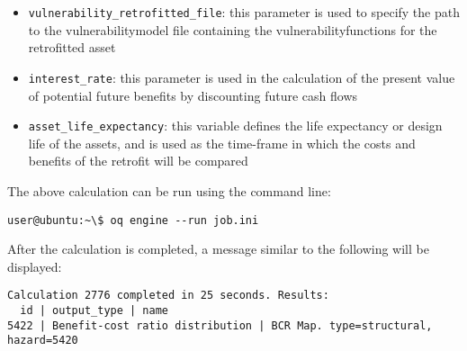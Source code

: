 \begin{itemize}

  \item \Verb+vulnerability_retrofitted_file+: this parameter is used to
    specify the path to the \gls{vulnerabilitymodel} file containing the
    \glspl{vulnerabilityfunction} for the retrofitted asset

  \item \Verb+interest_rate+: this parameter is used in the calculation of the
    present value of potential future benefits by discounting future cash flows

  \item \Verb+asset_life_expectancy+: this variable defines the life
    expectancy or design life of the assets, and is used as the time-frame in
    which the costs and benefits of the retrofit will be compared

\end{itemize}

The above calculation can be run using the command line:

\begin{verbatim}
user@ubuntu:~\$ oq engine --run job.ini
\end{verbatim}

After the calculation is completed, a message similar to the following will be
displayed:

\begin{verbatim}
Calculation 2776 completed in 25 seconds. Results:
  id | output_type | name
5422 | Benefit-cost ratio distribution | BCR Map. type=structural, hazard=5420
\end{verbatim}